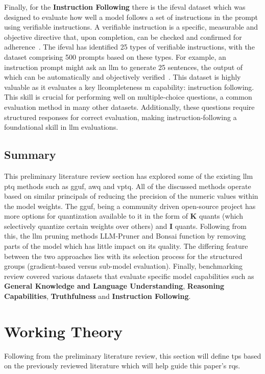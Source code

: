 \documentclass{ifacconf}
\begin{document}
	Finally, for the \textbf{Instruction Following} there is the \gls{ifeval} dataset which was designed to evaluate how well a model follows a set of instructions in the prompt using verifiable instructions. A verifiable instruction is a specific, measurable and objective directive that, upon completion, can be checked and confirmed for adherence~\cite{zhou2023instructionfollowingevaluationlargelanguage}. The \gls{ifeval} has identified 25 types of verifiable instructions, with the dataset comprising 500 prompts based on these types. For example, an instruction prompt might ask an \gls{llm} to generate 25 sentences, the output of which can be automatically and objectively verified~\cite{zhou2023instructionfollowingevaluationlargelanguage}. This dataset is highly valuable as it evaluates a key \gls{llcompleteness m} capability: instruction following. This skill is crucial for performing well on multiple-choice questions, a common evaluation method in many other datasets. Additionally, these questions require structured responses for correct evaluation, making instruction-following a foundational skill in \gls{llm} evaluations.
	
	\subsection{Summary}
	This preliminary literature review section has explored some of the existing \gls{llm} \gls{ptq} methods such as \gls{gguf}, \gls{awq} and \gls{vptq}. All of the discussed methods operate based on similar principals of reducing the precision of the numeric values within the model weights. The \gls{gguf}, being a community driven open-source project has more options for quantization available to it in the form of \textbf{K} quants (which selectively quantize certain weights over others) and \textbf{I} quants. Following from this, the \gls{llm} pruning methods LLM-Pruner and Bonsai function by removing parts of the model which has little impact on its quality. The differing feature between the two approaches lies with its selection process for the structured groups (gradient-based versus sub-model evaluation). Finally, benchmarking review covered various datasets that evaluate specific model capabilities such as \textbf{General Knowledge and Language Understanding}, \textbf{Reasoning Capabilities}, \textbf{Truthfulness} and \textbf{Instruction Following}. 
	
	\section{Working Theory}
	Following from the preliminary literature review, this section will define \glspl{tp} based on the previously reviewed literature which will help guide this paper's \glspl{rq}.
	
\end{document}

